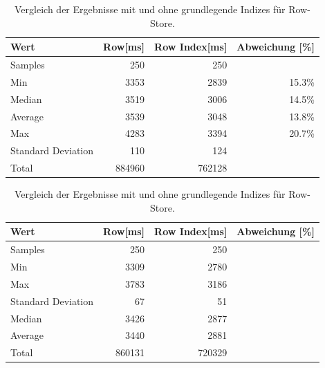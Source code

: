 \begin{table}[H]
    \begin{tabularx}{10cm}{lrrr}
        \toprule
        Wert                & Row[ms] & Row Index[ms]   & Abweichung [\%]\\
        \toprule
        Samples             & 250      & 250            &       \\
        Min                 & 3353     & 2839           &  15.3\%     \\
        Median              & 3519     & 3006           &  14.5\%     \\
        Average             & 3539     & 3048           &  13.8\%     \\
        Max                 & 4283     & 3394           &  20.7\%     \\
        Standard Deviation  & 110      & 124            &       \\
        Total               & 884960   & 762128         &       \\ 
        \bottomrule
    \end{tabularx}
\caption{Vergleich der Ergebnisse mit und ohne grundlegende Indizes für Row-Store.}
\label{tab:basic_index_row}
\end{table}





\begin{table}[H]
    \begin{tabularx}{10cm}{lrrr}
        \toprule
        Wert                & Row[ms] & Row Index[ms]   & Abweichung [\%]\\
        \toprule
        Samples             & 250     &  250            &       \\
        \midrule
        Min                 & 3309    &  2780           &       \\
        Max                 & 3783    &  3186           &       \\
        Standard Deviation  & 67      &  51             &       \\
        \midrule
        Median              & 3426    &  2877           &       \\
        Average             & 3440    &  2881           &       \\
        \midrule
        Total               & 860131  &  720329         &       \\
        \bottomrule
    \end{tabularx}
\caption{Vergleich der Ergebnisse mit und ohne grundlegende Indizes für Row-Store.}
\label{tab:basic_index_row}
\end{table}

